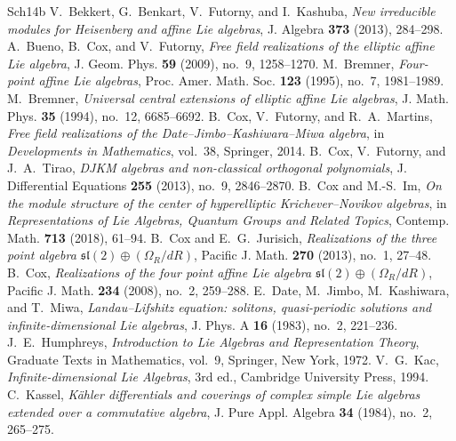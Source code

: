 \documentclass{amsart}
\theoremstyle{definition}
\theoremstyle{remark}
\numberwithin{equation}{section}
\begin{document}
\begin{thebibliography}{Sch14b}
V.~Bekkert, G.~Benkart, V.~Futorny, and I.~Kashuba,
\emph{New irreducible modules for Heisenberg and affine Lie algebras},
J. Algebra \textbf{373} (2013), 284--298.
A.~Bueno, B.~Cox, and V.~Futorny,
\emph{Free field realizations of the elliptic affine Lie algebra},
J. Geom. Phys. \textbf{59} (2009), no.~9, 1258--1270.
M.~Bremner,
\emph{Four-point affine Lie algebras},
Proc. Amer. Math. Soc. \textbf{123} (1995), no.~7, 1981--1989.
M.~Bremner,
\emph{Universal central extensions of elliptic affine Lie algebras},
J. Math. Phys. \textbf{35} (1994), no.~12, 6685--6692.
B.~Cox, V.~Futorny, and R.~A.~Martins,
\emph{Free field realizations of the {Date--Jimbo--Kashiwara--Miwa}
algebra},
in \emph{Developments in Mathematics}, vol.~38, Springer, 2014.
B.~Cox, V.~Futorny, and J.~A.~Tirao,
\emph{{DJKM} algebras and non-classical orthogonal polynomials},
J. Differential Equations \textbf{255} (2013), no.~9, 2846--2870.
B.~Cox and M.-S.~Im,
\emph{On the module structure of the center of hyperelliptic
{Krichever--Novikov} algebras},
in \emph{Representations of Lie Algebras, Quantum Groups and Related
Topics}, Contemp. Math. \textbf{713} (2018), 61--94.
B.~Cox and E.~G.~Jurisich,
\emph{Realizations of the three point algebra
$\mathfrak{sl}(2)\oplus(\Omega_R/dR)$},
Pacific J. Math. \textbf{270} (2013), no.~1, 27--48.
B.~Cox,
\emph{Realizations of the four point affine Lie algebra
$\mathfrak{sl}(2)\oplus(\Omega_R/dR)$},
Pacific J. Math. \textbf{234} (2008), no.~2, 259--288.
E.~Date, M.~Jimbo, M.~Kashiwara, and T.~Miwa,
\emph{Landau--Lifshitz equation: solitons, quasi-periodic solutions and
infinite-dimensional Lie algebras},
J. Phys. A \textbf{16} (1983), no.~2, 221--236.
J.~E.~Humphreys,
\emph{Introduction to Lie Algebras and Representation Theory},
Graduate Texts in Mathematics, vol.~9, Springer, New York, 1972.
V.~G.~Kac,
\emph{Infinite-dimensional Lie Algebras},
3rd ed., Cambridge University Press, 1994.
C.~Kassel,
\emph{K\"ahler differentials and coverings of complex simple Lie algebras
extended over a commutative algebra},
J. Pure Appl. Algebra \textbf{34} (1984), no.~2, 265--275.

\end{thebibliography}
\end{document}
